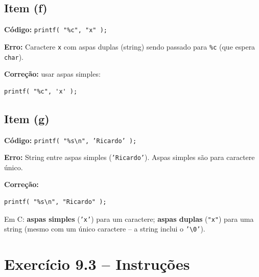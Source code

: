 \documentclass[12pt,a4paper]{article}
\begin{document}
\subsection*{Item (f)}
\begin{respostabox}
\textbf{Código:} \texttt{printf( "\%c", "x" );}

\textbf{Erro:} Caractere \texttt{x} com aspas duplas (string) sendo passado para
\texttt{\%c} (que espera \texttt{char}).

\textbf{Correção:} usar aspas simples:
\begin{lstlisting}
printf( "%c", 'x' );
\end{lstlisting}
\end{respostabox}

\subsection*{Item (g)}
\begin{respostabox}
\textbf{Código:} \texttt{printf( "\%s\textbackslash n", 'Ricardo' );}

\textbf{Erro:} String entre aspas simples (\texttt{'Ricardo'}). Aspas simples são
para caractere único.

\textbf{Correção:}
\begin{lstlisting}
printf( "%s\n", "Ricardo" );
\end{lstlisting}

\begin{boaprática}
  Em C: \textbf{aspas simples} (\texttt{'x'}) para um caractere; \textbf{aspas
  duplas} (\texttt{"x"}) para uma string (mesmo com um único caractere -- a string
  inclui o \texttt{'\textbackslash 0'}).
\end{boaprática}
\end{respostabox}

\newpage

\section{Exercício 9.3 -- Instruções}
\end{document}

